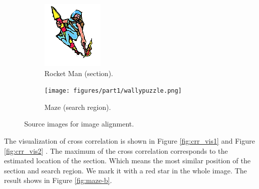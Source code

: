 \begin{figure}[h!]
	\centering
		\begin{subfigure}[t]{0.45\linewidth}
			\centering
			\includegraphics[width=0.6\linewidth]{figures/part1/wallypuzzle_rocketman.png}
			\caption{Rocket Man (section). }
			\label{fig:rocketman}
		\end{subfigure}
		\begin{subfigure}[t]{0.45\linewidth}
			\centering
			\texttt{[image: figures/part1/wallypuzzle.png]}
			\caption{Maze (search region). }
			\label{fig:maze-a}
		\end{subfigure}
		\caption{Source images for image alignment.}
\end{figure} 

The visualization of cross correlation is shown in Figure \ref{fig:crr_vis1} and Figure \ref{fig:crr_vis2} . The maximum of the cross correlation corresponds to the estimated location of the section. Which means the most similar position of the section and search region. We mark it with a red star in the whole image. The result shows in Figure \ref{fig:maze-b}.


